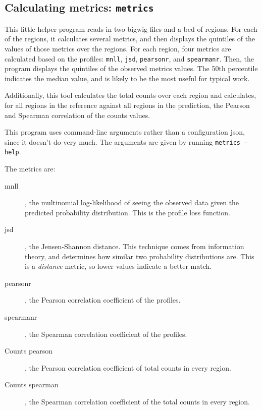 \documentclass{article}
\begin{document}
\newpage

\subsection{Calculating metrics: \texttt{metrics}}\label{prog:metrics}

This little helper program reads in two bigwig files and a bed of regions.
For each of the regions, it calculates several metrics, and then displays
the quintiles of the values of those metrics over the regions.
For each region, four metrics are calculated based on the profiles:
\texttt{mnll}, \texttt{jsd}, \texttt{pearsonr}, and \texttt{spearmanr}.
Then, the program displays the quintiles of the observed metrics values. The
50th percentile indicates the median value, and is likely to be the most useful
for typical work.

Additionally, this tool calculates the total counts over each region and
calculates, for all regions in the reference against all regions in the
prediction, the Pearson and Spearman correlation of the counts values.

This program uses command-line arguments rather than a configuration json,
since it doesn't do very much.
The arguments are given by running \texttt{metrics --help}.

The metrics are:
\begin{description}
    \item [mnll], the multinomial log-likelihood of seeing the observed data
        given the predicted probability distribution.
        This is the profile loss function.
    \item [jsd], the Jensen-Shannon distance.
        This technique comes from information theory, and determines how
        similar two probability distributions are.
        This is a \emph{distance} metric, so lower values indicate a better
        match.
    \item [pearsonr], the Pearson correlation coefficient of the profiles.
    \item [spearmanr], the Spearman correlation coefficient of the profiles.
    \item [Counts pearson], the Pearson correlation coefficient of total counts
        in every region.
    \item [Counts spearman], the Spearman correlation coefficient of the total
        counts in every region.
\end{description}


\newpage
\end{document}
